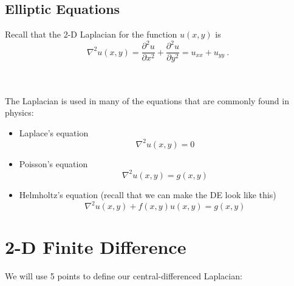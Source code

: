 \documentclass[12pt, answers]{exam}
\begin{document}
\subsection*{Elliptic Equations}

Recall that the 2-D Laplacian for the function $u(x,y)$ is
%
\ifprintanswers
\begin{equation}
\nabla^2 u(x,y) = \frac{\partial^2 u}{\partial x^2} + \frac{\partial^2 u}{\partial y^2} = u_{xx} + u_{yy} \:.\nonumber
\end{equation}
\else
\\ \vspace*{3em} \\
\fi

%
The Laplacian is used in many of the equations that are commonly found in physics:
%
\begin{itemize}
\item Laplace's equation
\[\nabla^2 u(x,y) = 0\]

\item Poisson's equation 
\[\nabla^2 u(x,y) = g(x,y)\]

\item Helmholtz's equation (recall that we can make the DE look like this)
\[\nabla^2 u(x,y) +f(x,y)u(x,y) = g(x,y)\]
\end{itemize}

\section*{2-D Finite Difference}

We will use 5 points to define our central-differenced Laplacian:
\end{document}
